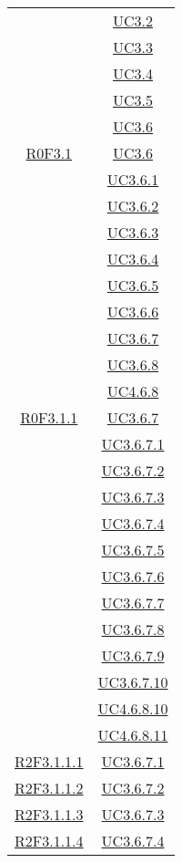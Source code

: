 \begin{longtable}{|c|c|}
& \hyperlink{UC3.2}{UC3.2}\\
& \hyperlink{UC3.3}{UC3.3}\\
& \hyperlink{UC3.4}{UC3.4}\\
& \hyperlink{UC3.5}{UC3.5}\\
& \hyperlink{UC3.6}{UC3.6}\\
\hline
\hyperlink{R0F3.1}{R0F3.1} & \hyperlink{UC3.6}{UC3.6}\\
& \hyperlink{UC3.6.1}{UC3.6.1}\\
& \hyperlink{UC3.6.2}{UC3.6.2}\\
& \hyperlink{UC3.6.3}{UC3.6.3}\\
& \hyperlink{UC3.6.4}{UC3.6.4}\\
& \hyperlink{UC3.6.5}{UC3.6.5}\\
& \hyperlink{UC3.6.6}{UC3.6.6}\\
& \hyperlink{UC3.6.7}{UC3.6.7}\\
& \hyperlink{UC3.6.8}{UC3.6.8}\\
& \hyperlink{UC4.6.8}{UC4.6.8}\\
\hline
\hyperlink{R0F3.1.1}{R0F3.1.1} & \hyperlink{UC3.6.7}{UC3.6.7}\\
& \hyperlink{UC3.6.7.1}{UC3.6.7.1}\\
& \hyperlink{UC3.6.7.2}{UC3.6.7.2}\\
& \hyperlink{UC3.6.7.3}{UC3.6.7.3}\\
& \hyperlink{UC3.6.7.4}{UC3.6.7.4}\\
& \hyperlink{UC3.6.7.5}{UC3.6.7.5}\\
& \hyperlink{UC3.6.7.6}{UC3.6.7.6}\\
& \hyperlink{UC3.6.7.7}{UC3.6.7.7}\\
& \hyperlink{UC3.6.7.8}{UC3.6.7.8}\\
& \hyperlink{UC3.6.7.9}{UC3.6.7.9}\\
& \hyperlink{UC3.6.7.10}{UC3.6.7.10}\\
& \hyperlink{UC4.6.8.10}{UC4.6.8.10}\\
& \hyperlink{UC4.6.8.11}{UC4.6.8.11}\\
\hline
\hyperlink{R2F3.1.1.1}{R2F3.1.1.1} & \hyperlink{UC3.6.7.1}{UC3.6.7.1}\\
\hline
\hyperlink{R2F3.1.1.2}{R2F3.1.1.2} & \hyperlink{UC3.6.7.2}{UC3.6.7.2}\\
\hline
\hyperlink{R2F3.1.1.3}{R2F3.1.1.3} & \hyperlink{UC3.6.7.3}{UC3.6.7.3}\\
\hline
\hyperlink{R2F3.1.1.4}{R2F3.1.1.4} & \hyperlink{UC3.6.7.4}{UC3.6.7.4}\\

\end{longtable}
